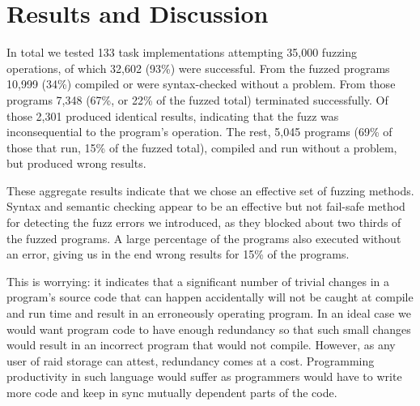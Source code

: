 \documentclass[10pt]{sigplanconf}
\begin{document}
\section{Results and Discussion} %
\label{sec:results}



In total we tested
133 task implementations
attempting 35,000 fuzzing operations,
of which 32,602 (93\%) were successful.
From the fuzzed programs 10,999 (34\%)
compiled or were syntax-checked without a problem.
From those programs 7,348 (67\%, or 22\% of the fuzzed total) terminated successfully.
Of those 2,301 produced identical results, indicating that the fuzz was
inconsequential to the program's operation.
The rest, 5,045 programs (69\% of those that run, 15\% of the fuzzed total),
compiled and run without a problem, but produced wrong results.

These aggregate results indicate that we chose an effective set
of fuzzing methods.
Syntax and semantic checking appear to be an effective but not
fail-safe method for detecting the fuzz errors we introduced,
as they blocked about two thirds of the fuzzed programs.
A large percentage of the programs also executed without an error,
giving us in the end wrong results for 15\% of the programs.

This is worrying:
it indicates that a significant number of trivial changes in a program's source
code that can happen accidentally will not be caught at compile and run
time and result in an erroneously operating program.
In an ideal case we would want program code to have enough redundancy
so that such small changes would result in an incorrect program
that would not compile.
However, as any user of {\sc raid} storage can attest,
redundancy comes at a cost.
Programming productivity in such language would suffer as programmers
would have to write more code and keep in sync mutually dependent parts
of the code.
\end{document}
